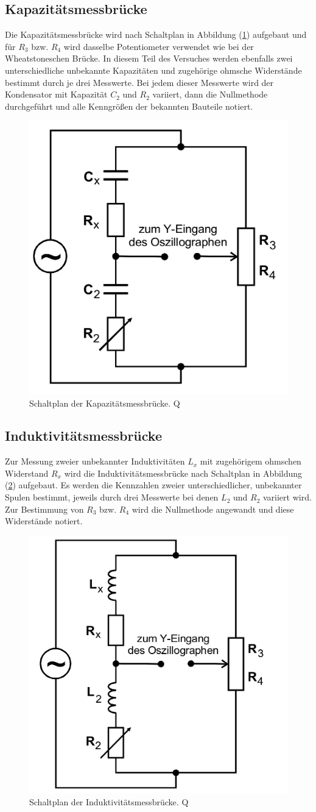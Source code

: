 \subsection{Kapazitätsmessbrücke}
Die Kapazitätsmessbrücke wird nach Schaltplan in Abbildung (\ref{pic:Kapazitaetsmessbruecke}) aufgebaut und für $R_3$ bzw. $R_4$ wird dasselbe Potentiometer
verwendet wie bei der Wheatstoneschen Brücke. In diesem Teil des Versuches werden ebenfalls zwei unterschiedliche unbekannte Kapazitäten und zugehörige 
ohmsche Widerstände bestimmt durch je drei Messwerte. Bei jedem dieser Messwerte wird der Kondensator mit Kapazität $C_2$ und $R_2$ variiert, dann die Nullmethode durchgeführt und alle Kenngrößen
der bekannten Bauteile notiert. 
\begin{figure}[H]
    \centering
    \includegraphics[width=0.4\linewidth]{Kapazitaet.png}
    \caption{Schaltplan der Kapazitätsmessbrücke. Q\cite{anleitungV302}}
    \label{pic:Kapazitaetsmessbruecke}
\end{figure}
\subsection{Induktivitätsmessbrücke}
Zur Messung zweier unbekannter Induktivitäten $L_x$ mit zugehörigem ohmschen Widerstand $R_x$ wird die Induktivitätsmessbrücke nach Schaltplan in Abbildung 
(\ref{pic:Induktivitaetsmessbruecke}) aufgebaut. Es werden die Kennzahlen zweier unterschiedlicher, unbekannter Spulen bestimmt, jeweils durch drei Messwerte bei 
denen $L_2$ und $R_2$ variiert wird. Zur Bestimmung von $R_3$ bzw. $R_4$ wird die Nullmethode angewandt und diese Widerstände notiert. 
\begin{figure}[H]
    \centering
    \includegraphics[width=0.4\linewidth]{Induktivitaet.png}
    \caption{Schaltplan der Induktivitätsmessbrücke. Q\cite{anleitungV302}}
    \label{pic:Induktivitaetsmessbruecke}
\end{figure} 

